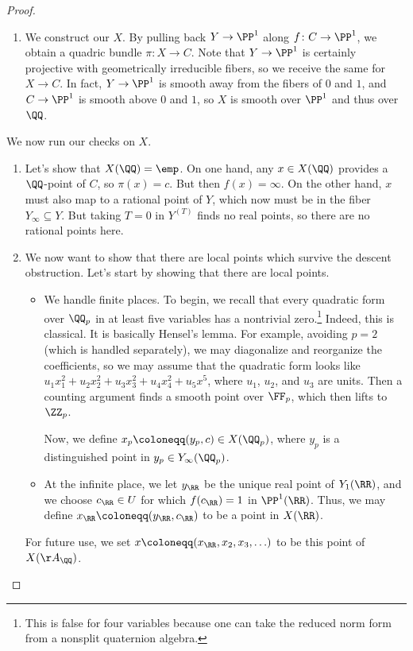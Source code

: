 \documentclass[../notes.tex]{subfiles}
\begin{document}
\begin{proof}
\begin{enumerate}
		\item We construct our $X$. By pulling back $Y\to\PP^1$ along $f\colon C\to\PP^1$, we obtain a quadric bundle $\pi\colon X\to C$. Note that $Y\to\PP^1$ is certainly projective with geometrically irreducible fibers, so we receive the same for $X\to C$. In fact, $Y\to\PP^1$ is smooth away from the fibers of $0$ and $1$, and $C\to\PP^1$ is smooth above $0$ and $1$, so $X$ is smooth over $\PP^1$ and thus over $\QQ$.
	\end{enumerate}
	We now run our checks on $X$.
	\begin{enumerate}[resume]
		\item Let's show that $X(\QQ)=\emp$. On one hand, any $x\in X(\QQ)$ provides a $\QQ$-point of $C$, so $\pi(x)=c$. But then $f(x)=\infty$. On the other hand, $x$ must also map to a rational point of $Y$, which now must be in the fiber $Y_\infty\subseteq Y$. But taking $T=0$ in $Y^{(T)}$ finds no real points, so there are no rational points here.

		\item We now want to show that there are local points which survive the descent obstruction. Let's start by showing that there are local points.
		\begin{itemize}
			\item We handle finite places. To begin, we recall that every quadratic form over $\QQ_p$ in at least five variables has a nontrivial zero.\footnote{This is false for four variables because one can take the reduced norm form from a nonsplit quaternion algebra.} Indeed, this is classical. It is basically Hensel's lemma. For example, avoiding $p=2$ (which is handled separately), we may diagonalize and reorganize the coefficients, so we may assume that the quadratic form looks like $u_1x_1^2+u_2x_2^2+u_3x_3^2+u_4x_4^2+u_5x^5$, where $u_1$, $u_2$, and $u_3$ are units. Then a counting argument finds a smooth point over $\FF_p$, which then lifts to $\ZZ_p$.

			Now, we define $x_p\coloneqq(y_p,c)\in X(\QQ_p)$, where $y_p$ is a distinguished point in $y_p\in Y_\infty(\QQ_p)$.

			\item At the infinite place, we let $y_\RR$ be the unique real point of $Y_1(\RR)$, and we choose $c_\RR\in U$ for which $f(c_\RR)=1$ in $\PP^1(\RR)$. Thus, we may define $x_\RR\coloneqq(y_\RR,c_\RR)$ to be a point in $X(\RR)$.
		\end{itemize}
		For future use, we set $x\coloneqq(x_\RR,x_2,x_3,\ldots)$ to be this point of $X(\AA_\QQ)$.


\end{enumerate}
\end{proof}
\end{document}
